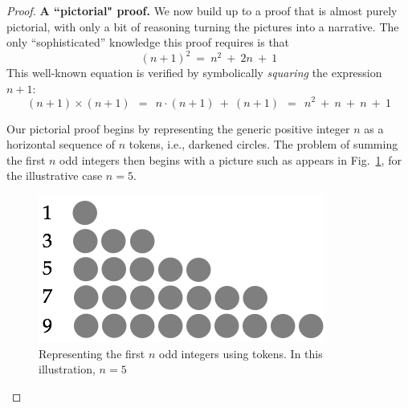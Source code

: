 \begin{proof}
{\bf A ``pictorial" proof.}
We now build up to a proof that is almost purely pictorial, with only a bit of reasoning turning the pictures into a narrative.  The only ``sophisticated'' knowledge this proof requires is that
\begin{equation}
\label{eq:(n+1)^2}
(n+1)^2 \ = \ n^2 \ + \ 2n \ + \ 1
\end{equation}
This well-known equation is verified by symbolically {\em squaring} the expression $n+1$:
\[ (n+1) \times (n+1) \ \ = \ \ n \cdot (n+1) \ + \ (n+1) 
     \ \ = \ \ n^2 \ + \ n \ + \ n \ + \ 1
\]

\medskip

\noindent {}

\medskip

Our pictorial proof begins by representing the generic positive integer $n$ as a horizontal sequence of $n$ tokens, i.e., darkened circles.  The problem of summing the first $n$ odd integers then begins with a picture such as appears in Fig.~\ref{fig:sumOdds1}, for the illustrative case $n=5$.
\begin{figure}[htb]
\begin{center}
       \includegraphics[scale=0.4]{FiguresMaths/SumOddsBasis}
\caption{Representing the first $n$ odd integers using tokens.  In this illustration, $n=5$}
       \label{fig:sumOdds1}
\end{center}
\end{figure}


\end{proof}
